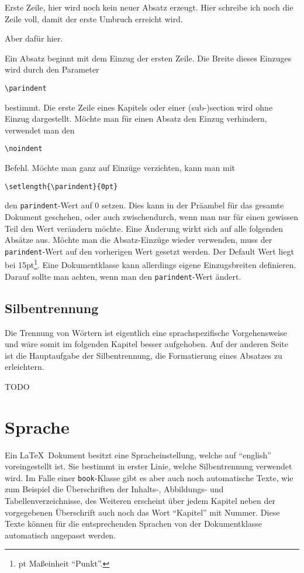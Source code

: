 \bigskip
\small

Erste Zeile,
hier wird noch kein neuer Absatz erzeugt. Hier schreibe ich noch die Zeile voll, damit der erste Umbruch erreicht wird.

Aber dafür hier.
\normalfont

\bigskip

Ein Absatz beginnt mit dem Einzug der ersten Zeile. Die Breite dieses Einzuges wird durch den Parameter 
\begin{verbatim}
\parindent
\end{verbatim}
bestimmt. Die erste Zeile eines Kapitels oder einer (sub-)section wird ohne Einzug dargestellt. Möchte man für einen Absatz den Einzug verhindern, verwendet man den 
\begin{verbatim}
\noindent
\end{verbatim}
Befehl. Möchte man ganz auf Einzüge verzichten, kann man mit 
\begin{verbatim}
\setlength{\parindent}{0pt}
\end{verbatim}
den \texttt{parindent}-Wert auf 0 setzen. Dies kann in der Präambel für das gesamte Dokument geschehen, oder auch zwischendurch, wenn man nur für einen gewissen Teil den Wert verändern möchte. Eine Änderung wirkt sich auf alle folgenden Absätze aus. Möchte man die Absatz-Einzüge wieder verwenden, muss der \texttt{parindent}-Wert auf den vorherigen Wert gesetzt werden. Der Default Wert liegt bei 15pt\footnote{pt Maßeinheit "`Punkt"'.}. Eine Dokumentklasse kann allerdings eigene Einzugsbreiten definieren. Darauf sollte man achten, wenn man den \texttt{parindent}-Wert ändert.

\subsection{Silbentrennung}

Die Trennung von Wörtern ist eigentlich eine sprachspezifische Vorgehensweise und wäre somit im folgenden Kapitel besser aufgehoben. Auf der anderen Seite ist die Hauptaufgabe der Silbentrennung, die Formatierung eines Absatzes zu erleichtern. 

TODO

\section{Sprache}

Ein \LaTeX\ Dokument besitzt eine Spracheinstellung, welche auf "`english"' voreingestellt ist. Sie bestimmt in erster Linie, welche Silbentrennung verwendet wird. Im Falle einer \texttt{book}-Klasse gibt es aber auch noch automatische Texte, wie zum Beispiel die Überschriften der Inhalts-, Abbildungs- und Tabellenverzeichnisse, des Weiteren erscheint über jedem Kapitel neben der vorgegebenen Überschrift auch noch das Wort "`Kapitel"' mit Nummer. Diese Texte können für die entsprechenden Sprachen von der Dokumentklasse automatisch angepasst werden. 

